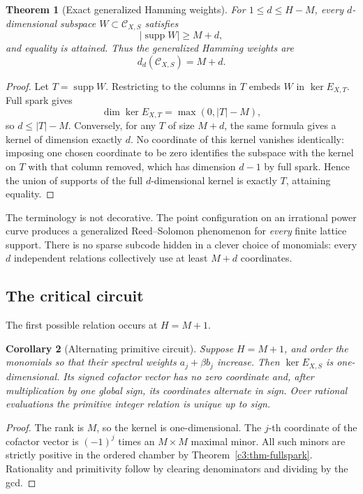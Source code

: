 \documentclass[11pt,oneside]{article}
\newtheorem{theorem}{Theorem}[section]
\newtheorem{corollary}[theorem]{Corollary}
\theoremstyle{definition}
\theoremstyle{remark}
\newcommand{\supp}{\operatorname{supp}}
\begin{document}
\begin{theorem}[Exact generalized Hamming weights]
\label{c3:thm-mds}
For $1\le d\le H-M$, every $d$-dimensional subspace
$W\subset\mathcal C_{X,S}$ satisfies
\[
 |\supp W|\ge M+d,
\]
and equality is attained.  Thus the generalized Hamming weights are
\[
 d_d(\mathcal C_{X,S})=M+d.
\]
\end{theorem}

\begin{proof}
Let $T=\supp W$.  Restricting to the columns in $T$ embeds $W$ in
$\ker E_{X,T}$.  Full spark gives
\[
 \dim\ker E_{X,T}=\max(0,|T|-M),
\]
so $d\le|T|-M$.  Conversely, for any $T$ of size $M+d$, the same formula gives a kernel of dimension
exactly $d$.  No coordinate of this kernel vanishes identically: imposing one chosen
coordinate to be zero identifies the subspace with the kernel on $T$ with that column
removed, which has dimension $d-1$ by full spark.  Hence the union of supports of the
full $d$-dimensional kernel is exactly $T$, attaining equality.
\end{proof}

The terminology is not decorative.  The point configuration on an irrational power curve
produces a generalized Reed--Solomon phenomenon for \emph{every} finite lattice support.
There is no sparse subcode hidden in a clever choice of monomials: every $d$ independent
relations collectively use at least $M+d$ coordinates.

\subsection{The critical circuit}

The first possible relation occurs at $H=M+1$.

\begin{corollary}[Alternating primitive circuit]
\label{c3:cor-circuit}
Suppose $H=M+1$, and order the monomials so that their spectral weights
$a_j+\beta b_j$ increase.  Then $\ker E_{X,S}$ is one-dimensional.  Its signed cofactor
vector has no zero coordinate and, after multiplication by one global sign, its coordinates
alternate in sign.  Over rational evaluations the primitive integer relation is unique up to
sign.
\end{corollary}

\begin{proof}
The rank is $M$, so the kernel is one-dimensional.  The $j$-th coordinate of the cofactor
vector is $(-1)^j$ times an $M\times M$ maximal minor.  All such minors are strictly positive
in the ordered chamber by Theorem~\ref{c3:thm-fullspark}.  Rationality and primitivity follow
by clearing denominators and dividing by the gcd.
\end{proof}
\end{document}
